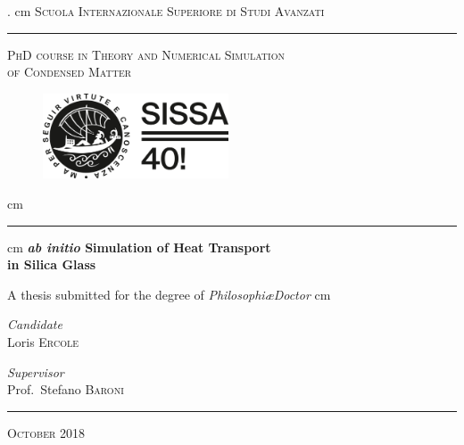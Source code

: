 \begin{titlepage}
\begin{center}

  . cm
\textsc{\Large Scuola Internazionale Superiore di Studi Avanzati} %
\vskip 0.75cm
\hrule height 1 pt
\vskip 0.75cm
\textsc{\fontsize{14}{16}\selectfont PhD course in Theory and Numerical Simulation\\
of Condensed Matter}
\vskip 0.5cm

 \begin{figure}[h]
 \centering
 \includegraphics[width=5.5cm]{frontmatter/SISSA_40_alt.png}
 \end{figure}

 cm
\hrule height 1 pt
 cm
{ \fontsize{20}{22} \bfseries  \emph{ab initio} Simulation of Heat Transport \\
\vspace{0.4cm}
in Silica Glass
}
\vfill

{A thesis submitted for the degree of \textit{Philosophi\ae Doctor}}
 cm

\begin{center}
\begin{minipage}{0.3\textwidth}
\fontsize{12}{14}\selectfont
\emph{Candidate}\\
\smallskip
Loris \textsc{Ercole}
\end{minipage}
\hspace{2cm}
\begin{minipage}{0.3\textwidth}
\fontsize{12}{14}\selectfont
\emph{Supervisor}\\
\smallskip
Prof.~Stefano \textsc{Baroni}
\end{minipage}
\end{center}
\vspace{1cm}



\hrule height 1 pt
\vskip 0.5cm

\textsc{\large October 2018}

\end{center}

\end{titlepage} 